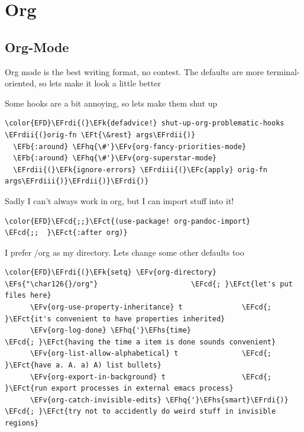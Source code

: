 \documentclass{scrartcl}
\newcommand{\EFk}[1]{\textcolor{EFk}{#1}} %
\newcommand{\EFt}[1]{\textcolor{EFt}{#1}} %
\newcommand{\EFs}[1]{\textcolor{EFs}{#1}} %
\newcommand{\EFb}[1]{\textcolor{EFb}{#1}} %
\newcommand{\EFct}[1]{\textcolor{EFct}{#1}} %
\newcommand{\EFc}[1]{\textcolor{EFc}{#1}} %
\newcommand{\EFv}[1]{\textcolor{EFv}{#1}} %
\newcommand{\EFcd}[1]{\textcolor{EFcd}{#1}} %
\newcommand{\EFhq}[1]{#1} %
\newcommand{\EFhs}[1]{#1} %
\newcommand{\EFrdi}[1]{#1} %
\newcommand{\EFrdii}[1]{#1} %
\newcommand{\EFrdiii}[1]{#1} %
\begin{document}
\section{Org}
\label{sec:orge8a0c7f}
\subsection{Org-Mode}
\label{sec:org3f3ef86}
Org mode is the best writing format, no contest. The defaults are more
terminal-oriented, so lets make it look a little better

Some hooks are a bit annoying, so lets make them shut up
\begin{Code}
\begin{Verbatim}[]
\color{EFD}\EFrdi{(}\EFk{defadvice!} shut-up-org-problematic-hooks \EFrdii{(}orig-fn \EFt{\&rest} args\EFrdii{)}
  \EFb{:around} \EFhq{\#'}\EFv{org-fancy-priorities-mode}
  \EFb{:around} \EFhq{\#'}\EFv{org-superstar-mode}
  \EFrdii{(}\EFk{ignore-errors} \EFrdiii{(}\EFc{apply} orig-fn args\EFrdiii{)}\EFrdii{)}\EFrdi{)}
\end{Verbatim}
\end{Code}

Sadly I can't always work in org, but I can import stuff into it!
\begin{Code}
\begin{Verbatim}[]
\color{EFD}\EFcd{;;}\EFct{(use-package! org-pandoc-import}
\EFcd{;;  }\EFct{:after org)}
\end{Verbatim}
\end{Code}

I prefer /org as my directory. Lets change some other defaults too
\begin{Code}
\begin{Verbatim}[]
\color{EFD}\EFrdi{(}\EFk{setq} \EFv{org-directory} \EFs{"\char126{}/org"}                      \EFcd{; }\EFct{let's put files here}
      \EFv{org-use-property-inheritance} t              \EFcd{; }\EFct{it's convenient to have properties inherited}
      \EFv{org-log-done} \EFhq{'}\EFhs{time}                          \EFcd{; }\EFct{having the time a item is done sounds convenient}
      \EFv{org-list-allow-alphabetical} t               \EFcd{; }\EFct{have a. A. a) A) list bullets}
      \EFv{org-export-in-background} t                  \EFcd{; }\EFct{run export processes in external emacs process}
      \EFv{org-catch-invisible-edits} \EFhq{'}\EFhs{smart}\EFrdi{)}            \EFcd{; }\EFct{try not to accidently do weird stuff in invisible regions}
\end{Verbatim}
\end{Code}
\end{document}
